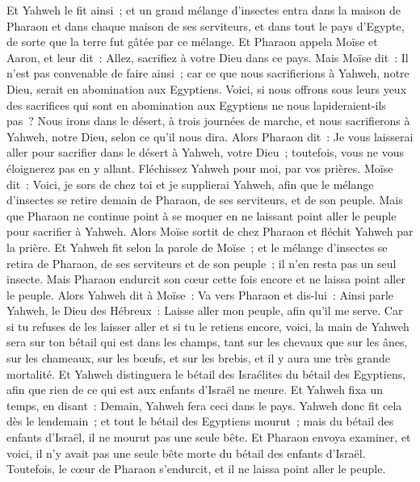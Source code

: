 \begin{multicols}{2}
Et Yahweh le fit ainsi~; et un grand mélange d'insectes entra dans la maison de Pharaon et dans chaque maison de ses serviteurs, et dans tout le pays d'Egypte, de sorte que la terre fut gâtée par ce mélange.
 Et Pharaon appela Moïse et Aaron, et leur dit~: Allez, sacrifiez à votre Dieu dans ce pays.
Mais Moïse dit~: Il n'est pas convenable de faire ainsi~; car ce que nous sacrifierions à Yahweh, notre Dieu, serait en abomination aux Egyptiens. Voici, si nous offrons sous leurs yeux des sacrifices qui sont en abomination aux Egyptiens ne nous lapideraient-ils pas~?
Nous irons dans le désert, à trois journées de marche, et nous sacrifierons à Yahweh, notre Dieu, selon ce qu'il nous dira.
Alors Pharaon dit~: Je vous laisserai aller pour sacrifier dans le désert à Yahweh, votre Dieu~; toutefois, vous ne vous éloignerez pas en y allant. Fléchissez Yahweh pour moi, par vos prières.
Moïse dit~: Voici, je sors de chez toi et je supplierai Yahweh, afin que le mélange d'insectes se retire demain de Pharaon, de ses serviteurs, et de son peuple. Mais que Pharaon ne continue point à se moquer en ne laissant point aller le peuple pour sacrifier à Yahweh.
Alors Moïse sortit de chez Pharaon et fléchit Yahweh par la prière.
Et Yahweh fit selon la parole de Moïse~; et le mélange d'insectes se retira de Pharaon, de ses serviteurs et de son peuple~; il n'en resta pas un seul insecte.
Mais Pharaon endurcit son cœur cette fois encore et ne laissa point aller le peuple.
\VerseOne{}Alors Yahweh dit à Moïse~: Va vers Pharaon et dis-lui~: Ainsi parle Yahweh, le Dieu des Hébreux~: Laisse aller mon peuple, afin qu'il me serve.
Car si tu refuses de les laisser aller et si tu le retiens encore,
voici, la main de Yahweh sera sur ton bétail qui est dans les champs, tant sur les chevaux que sur les ânes, sur les chameaux, sur les bœufs, et sur les brebis, et il y aura une très grande mortalité.
Et Yahweh distinguera le bétail des Israélites du bétail des Egyptiens, afin que rien de ce qui est aux enfants d'Israël ne meure.
Et Yahweh fixa un temps, en disant~: Demain, Yahweh fera ceci dans le pays.
Yahweh donc fit cela dès le lendemain~; et tout le bétail des Egyptiens mourut~; mais du bétail des enfants d'Israël, il ne mourut pas une seule bête.
Et Pharaon envoya examiner, et voici, il n'y avait pas une seule bête morte du bétail des enfants d'Israël. Toutefois, le cœur de Pharaon s'endurcit, et il ne laissa point aller le peuple.

\end{multicols}

